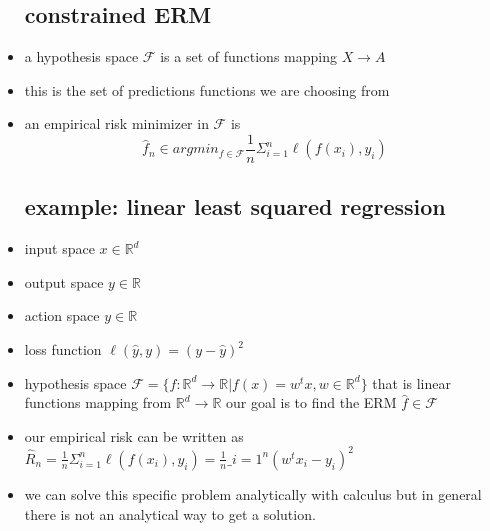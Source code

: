 \documentclass{article}
\begin{document}
\begin{itemize}
\subsection{constrained ERM}
\item a hypothesis space $\mathcal{F}$ is a set of functions mapping $X\rightarrow A$ 
\item this is the set of predictions functions we are choosing from 
\item an empirical risk minimizer in $\mathcal{F}$ is $$\hat{f}_{n}\in argmin_{f\in\mathcal{F}}\frac{1}{n}\Sigma_{i=1}^{n}\ell(f(x_i),y_i)$$
\subsection{example: linear least squared regression}
\item input space $x\in \mathbb{R}^d$
\item output space $y\in \mathbb{R}$
\item action space $y\in \mathbb{R}$
\item loss function $\ell(\hat{y},y)=(y-\hat{y})^2$
\item hypothesis space $\mathcal{F}=\{f:\mathbb{R}^{d}\rightarrow \mathbb{R}| f(x)=w^{t}x,w\in \mathbb{R}^{d}\}$ that is linear functions mapping from $\mathbb{R}^{d}\rightarrow \mathbb{R}$
\imte our goal is to find the ERM $\hat{f}\in \mathcal{F}$
\item our empirical risk can be written as $\hat{R}_{n}=\frac{1}{n}\Sigma_{i=1}^{n}\ell(f(x_i),y_i)=\frac{1}{n}\_{i=1}^{n}(w^tx_i-y_i)^2$
\item we can solve this specific problem analytically with calculus but in general there is not an analytical way to get a solution. 

\end{itemize}
\end{document}
